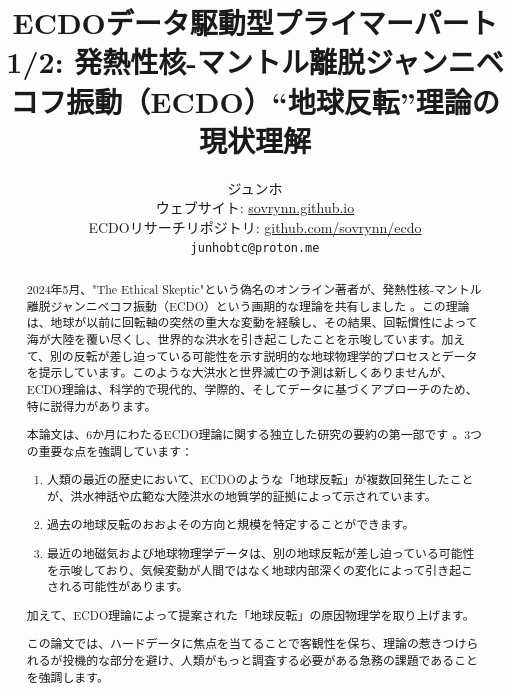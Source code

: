 \documentclass[10pt,twocolumn,letterpaper]{article}
\begin{document}
\title{ECDOデータ駆動型プライマーパート1/2: 発熱性核-マントル離脱ジャンニベコフ振動（ECDO）“地球反転”理論の現状理解}

\author{ジュンホ\\
ウェブサイト: \href{https://sovrynn.github.io}{sovrynn.github.io}\\
ECDOリサーチリポジトリ: \href{https://github.com/sovrynn/ecdo}{github.com/sovrynn/ecdo}\\
{\tt\small junhobtc@proton.me}
}

\maketitle

\begin{abstract}
2024年5月、"The Ethical Skeptic"という偽名のオンライン著者が、発熱性核-マントル離脱ジャンニベコフ振動（ECDO）という画期的な理論を共有しました \cite{0}。この理論は、地球が以前に回転軸の突然の重大な変動を経験し、その結果、回転慣性によって海が大陸を覆い尽くし、世界的な洪水を引き起こしたことを示唆しています。加えて、別の反転が差し迫っている可能性を示す説明的な地球物理学的プロセスとデータを提示しています。このような大洪水と世界滅亡の予測は新しくありませんが、ECDO理論は、科学的で現代的、学際的、そしてデータに基づくアプローチのため、特に説得力があります。

本論文は、6か月にわたるECDO理論に関する独立した研究の要約の第一部です \cite{2,20}。3つの重要な点を強調しています：

\begin{flushleft}
\begin{enumerate}
    \item 人類の最近の歴史において、ECDOのような「地球反転」が複数回発生したことが、洪水神話や広範な大陸洪水の地質学的証拠によって示されています。
    \item 過去の地球反転のおおよその方向と規模を特定することができます。
    \item 最近の地磁気および地球物理学データは、別の地球反転が差し迫っている可能性を示唆しており、気候変動が人間ではなく地球内部深くの変化によって引き起こされる可能性があります。
\end{enumerate}
\end{flushleft}

加えて、ECDO理論によって提案された「地球反転」の原因物理学を取り上げます。

この論文では、ハードデータに焦点を当てることで客観性を保ち、理論の惹きつけられるが投機的な部分を避け、人類がもっと調査する必要がある急務の課題であることを強調します。
\end{abstract}
\end{document}
